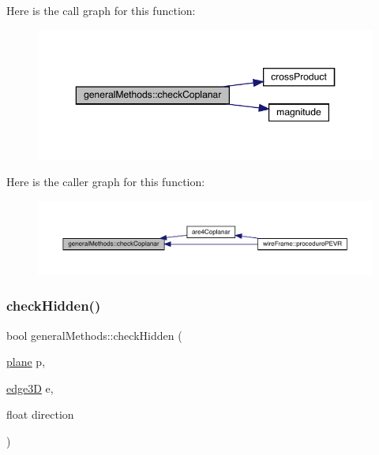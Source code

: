 Here is the call graph for this function\+:
\nopagebreak
\begin{figure}[H]
\begin{center}
\leavevmode
\includegraphics[width=350pt]{namespacegeneral_methods_a508d15a0c76920dc4f98cf8da254f9c4_cgraph}
\end{center}
\end{figure}
Here is the caller graph for this function\+:
\nopagebreak
\begin{figure}[H]
\begin{center}
\leavevmode
\includegraphics[width=350pt]{namespacegeneral_methods_a508d15a0c76920dc4f98cf8da254f9c4_icgraph}
\end{center}
\end{figure}
\mbox{\label{namespacegeneral_methods_a44d97941601f5929b217570ba9027d27}} 
\subsubsection{\texorpdfstring{check\+Hidden()}{checkHidden()}\hspace{0.1cm}{\footnotesize\ttfamily [1/2]}}
{\footnotesize\ttfamily bool general\+Methods\+::check\+Hidden (\begin{DoxyParamCaption}\item[{\mbox{\hyperlink{structplane}{plane}}}]{p,  }\item[{\mbox{\hyperlink{structedge3_d}{edge3D}}}]{e,  }\item[{float}]{direction }\end{DoxyParamCaption})}

